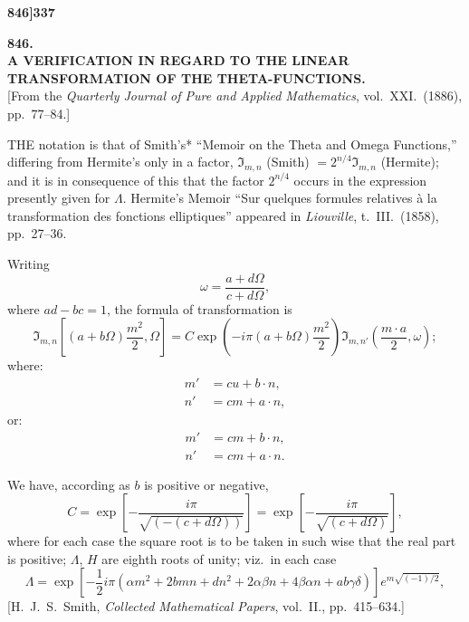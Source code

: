 \documentclass[11pt,a4paper]{book}
\begin{document}
\newpage
\setcounter{page}{337}

\noindent\textbf{846]}\hfill\textbf{337}

\bigskip

\begin{center}
{\Large\textbf{846.}}\\[1em]
{\large\textbf{A VERIFICATION IN REGARD TO THE LINEAR TRANSFORMATION OF THE THETA-FUNCTIONS.}}\\[1em]
[From the \textit{Quarterly Journal of Pure and Applied Mathematics}, vol.\ XXI.\ (1886), pp.\ 77--84.]
\end{center}

\bigskip

\noindent THE notation is that of Smith's* ``Memoir on the Theta and Omega Functions,'' differing from Hermite's only in a factor, $\Im_{m,n}$ (Smith) $= 2^{n/4} \Im_{m,n}$ (Hermite); and it is in consequence of this that the factor $2^{n/4}$ occurs in the expression presently given for $\Lambda$. Hermite's Memoir ``Sur quelques formules relatives \`a la transformation des fonctions elliptiques'' appeared in \textit{Liouville}, t.\ III.\ (1858), pp.\ 27--36.

Writing
\[
\omega = \frac{a + d\Omega}{c + d\Omega},
\]
where $ad - bc = 1$, the formula of transformation is
\[
\Im_{m,n}\left[(a + b\Omega)\frac{m^2}{2}, \Omega\right] = C \exp\left(-i\pi(a + b\Omega)\frac{m^2}{2}\right) \Im_{m,n'}\left(\frac{m\cdot a}{2}, \omega\right);
\]
where:
\begin{align*}
m' &= cu + b \cdot n, \\
n' &= cm + a \cdot n,
\end{align*}
or:
\begin{align*}
m' &= cm + b \cdot n, \\
n' &= cm + a \cdot n.
\end{align*}

We have, according as $b$ is positive or negative,
\[
C = \exp\left[-\frac{i\pi}{\sqrt{(-(c + d\Omega))}}\right] = \exp\left[-\frac{i\pi}{\sqrt{(c + d\Omega)}}\right],
\]
where for each case the square root is to be taken in such wise that the real part is positive; $\Lambda$, $H$ are eighth roots of unity; viz.\ in each case
\[
\Lambda = \exp\left[-\frac{1}{2}i\pi(\alpha m^2 + 2bmn + dn^2 + 2\alpha\beta n + 4\beta\alpha n + ab\gamma\delta)\right] e^{m\sqrt{(-1)/2}},
\]
\hfill *[H.\ J.\ S.\ Smith, \textit{Collected Mathematical Papers}, vol.\ II., pp.\ 415--634.]

\newpage
\setcounter{page}{338}
\end{document}
